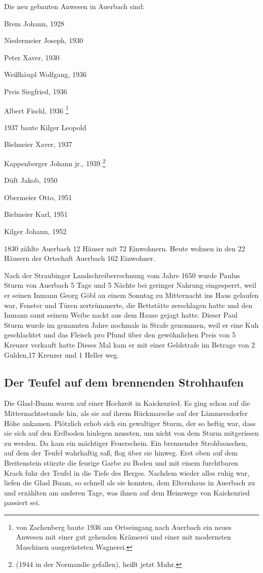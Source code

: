 \documentclass{book}
\begin{document}
Die neu gebauten Anwesen in Auerbach sind:

\begin{compactitem}
\item Brem Johann, 1928
\item Niedermeier Joseph, 1930
\item Peter Xaver, 1930
\item Weißhäupl Wolfgang, 1936
\item Preis Siegfried, 1936
\item Albert Fischl, 1936 \footnote{von Zachenberg baute 1936 am
Ortseingang nach Auerbach ein neues Anwesen mit einer gut gehenden
Krämerei und einer mit modernsten Maschinen ausgerüsteten Wagnerei.}
\item 1937 baute Kilger Leopold
\item Bielmeier Xaver, 1937
\item Kappenberger Johann jr., 1939 \footnote{(1944 in der Normandie
gefallen), heißt jetzt Muhr.}
\item Düft Jakob, 1950
\item Obermeier Otto, 1951
\item Bielmeier Karl, 1951
\item Kilger Johann, 1952
\end{compactitem}

1830 zählte Auerbach 12 Häuser mit 72 Einwohnern. Heute wohnen in den 22
Häusern der Ortschaft Auerbach 162 Einwohner.

Nach der Straubinger Landschreiberrechnung vom Jahre 1650 wurde Paulus
Sturm von Auerbach 5 Tage und 5 Nächte bei geringer Nahrung eingesperrt,
weil er seinen Inmann Georg Göbl an einem Sonntag zu Mitternacht ins
Haus gelaufen war, Fenster und Türen zertrümmerte, die Bettstätte
zerschlagen hatte und den Inmann samt seinem Weibe nackt aus dem Hause
gejagt hatte. Dieser Paul Sturm wurde im genannten Jahre nochmals in
Strafe genommen, weil er eine Kuh geschlachtet und das Fleisch pro Pfund
über den gewöhnlichen Preis von 5 Kreuzer verkauft hatte Dieses Mal kam
er mit einer Geldstrafe im Betrage von 2 Gulden,17 Kreuzer und 1 Heller
weg.

\subsection{Der Teufel auf dem brennenden Strohhaufen}

Die Glasl-Buam waren auf einer Hochzeit in Kaickenried. Es ging schon
auf die Mitternachtsstunde hin, als sie auf ihrem Rückmarsche auf der
Lämmersdorfer Höhe ankamen. Plötzlich erhob sich ein gewaltiger Sturm,
der so heftig war, dass sie sich auf den Erdboden hinlegen mussten, um
nicht von dem Sturm mitgerissen zu werden. Da kam ein mächtiger
Feuerschein. Ein brennender Strohbauschen, auf dem der Teufel wahrhaftig
saß, flog über sie hinweg. Erst oben auf dem Breitenstein stürzte die
feurige Garbe zu Boden und mit einem furchtbaren Krach fuhr der Teufel
in die Tiefe des Berges. Nachdem wieder alles ruhig war, liefen die
Glasl Buam, so schnell als sie konnten, dem Elternhaus in Auerbach zu
und erzählten am anderen Tage, was ihnen auf dem Heimwege von
Kaickenried passiert sei.
\end{document}
